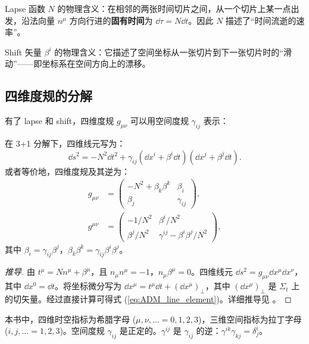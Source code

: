 Lapse 函数 $N$ 的物理含义：在相邻的两张时间切片之间，从一个切片上某一点出发，沿法向量 $n^\mu$ 方向行进的\textbf{固有时间}为 $\dd\tau = N \dd t$。因此 $N$ 描述了“时间流逝的速率”。

Shift 矢量 $\beta^i$ 的物理含义：它描述了空间坐标从一张切片到下一张切片时的“滑动”——即坐标系在空间方向上的漂移。

\subsection{四维度规的分解}

有了 lapse 和 shift，四维度规 $g_{\mu\nu}$ 可以用空间度规 $\gamma_{ij}$ 表示：

\begin{theorem}
在 3+1 分解下，四维线元写为：
\begin{equation}
    \boxed{\dd s^2 = -N^2 \dd t^2 + \gamma_{ij}(\dd x^i + \beta^i \dd t)(\dd x^j + \beta^j \dd t)}.
    \label{eq:ADM_line_element}
\end{equation}
或者等价地，四维度规及其逆为：
\begin{align}
    g_{\mu\nu} &= \begin{pmatrix}
        -N^2 + \beta_k\beta^k & \beta_i \\
        \beta_j & \gamma_{ij}
    \end{pmatrix},
    \label{eq:ADM_metric_matrix}
    \\[4pt]
    g^{\mu\nu} &= \begin{pmatrix}
        -1/N^2 & \beta^i/N^2 \\[2pt]
        \beta^j/N^2 & \gamma^{ij} - \beta^i\beta^j/N^2
    \end{pmatrix},
    \label{eq:ADM_inverse_metric}
\end{align}
其中 $\beta_i = \gamma_{ij}\beta^j$，$\beta_k\beta^k = \gamma_{ij}\beta^i\beta^j$。
\label{thm:ADM_metric}
\end{theorem}

\begin{proof}[推导]
由 $t^\mu = N n^\mu + \beta^\mu$，且 $n_\mu n^\mu = -1$，$n_\mu \beta^\mu = 0$。四维线元 $\dd s^2 = g_{\mu\nu}\dd x^\mu\dd x^\nu$，其中 $\dd x^0 = \dd t$。将坐标微分写为 $\dd x^\mu = t^\mu \dd t + (\dd x^\mu)_\perp$，其中 $(\dd x^\mu)_\perp$ 是 $\Sigma_t$ 上的切矢量。经过直接计算可得式 (\ref{eq:ADM_line_element})。详细推导见 \cite{Gourgoulhon2007}。
\end{proof}

\begin{note}[符号约定]
本书中，四维时空指标为希腊字母 ($\mu,\nu,\ldots=0,1,2,3$)，三维空间指标为拉丁字母 ($i,j,\ldots=1,2,3$)。空间度规 $\gamma_{ij}$ 是正定的。$\gamma^{ij}$ 是 $\gamma_{ij}$ 的逆：$\gamma^{ik}\gamma_{kj} = \delta^i_j$。
\end{note}


